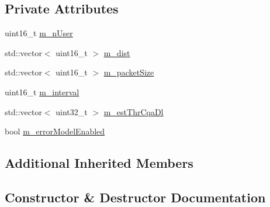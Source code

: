 \subsection*{Private Attributes}
\begin{DoxyCompactItemize}
\item 
uint16\+\_\+t \hyperlink{classLenaCqaFfMacSchedulerTestCase2_a335a7e080f06c9fed2a1b431389615f1}{m\+\_\+n\+User}
\item 
std\+::vector$<$ uint16\+\_\+t $>$ \hyperlink{classLenaCqaFfMacSchedulerTestCase2_a8d0cd5c486d9a7fa2581dbe5ca8e6997}{m\+\_\+dist}
\item 
std\+::vector$<$ uint16\+\_\+t $>$ \hyperlink{classLenaCqaFfMacSchedulerTestCase2_ad46ead6ee3f29ac4d167b294e9fd7a7c}{m\+\_\+packet\+Size}
\item 
uint16\+\_\+t \hyperlink{classLenaCqaFfMacSchedulerTestCase2_a682a0b8a7dee755e81395b515b0643e4}{m\+\_\+interval}
\item 
std\+::vector$<$ uint32\+\_\+t $>$ \hyperlink{classLenaCqaFfMacSchedulerTestCase2_af7b1e3432de5d610468ae357041e378c}{m\+\_\+est\+Thr\+Cqa\+Dl}
\item 
bool \hyperlink{classLenaCqaFfMacSchedulerTestCase2_a517e6364b00e790263dea8601cc2c766}{m\+\_\+error\+Model\+Enabled}
\end{DoxyCompactItemize}
\subsection*{Additional Inherited Members}


\subsection{Constructor \& Destructor Documentation}
